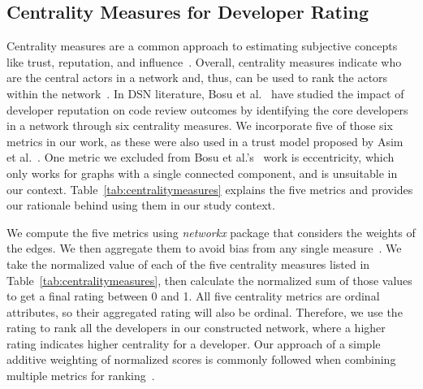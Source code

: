 \documentclass[10pt,journal,compsoc]{IEEEtran}
\begin{document}
\subsection{Centrality Measures for Developer Rating}
\label{sec:centrality}
 Centrality measures are a common approach to estimating subjective concepts like trust, reputation, and influence~\cite{bosu2014identifying, asim2019trust, ceolin2017social, meo2017using, zahi2020improved, csimcsek2020combined}. Overall, centrality measures indicate who are the central actors in a network and, thus, can be used to rank the actors within the network~\cite{riquelme2018centrality, cadini2009using}. In DSN literature, Bosu et al.~\cite{bosu2014impact} have studied the impact of developer reputation on code review outcomes by identifying the core developers in a network through six centrality measures. We incorporate five of those six metrics in our work, as these were also used in a trust model proposed by Asim et al.~\cite{asim2019trust}. One metric we excluded from Bosu et al.'s~\cite{bosu2014impact} work is eccentricity, which only works for graphs with a single connected component, and is unsuitable in our context. Table~\ref{tab:centralitymeasures} explains the five metrics and provides our rationale behind using them in our study context. 

We compute the five metrics using \textit{networkx} package that considers the weights of the edges. We then aggregate them to avoid bias from any single measure~\cite{bosu2014identifying, csimcsek2020combined}. We take the normalized value of each of the five centrality measures listed in Table~\ref{tab:centralitymeasures}, then calculate the normalized sum of those values to get a final rating between 0 and 1. All five centrality metrics are ordinal attributes, so their aggregated rating will also be ordinal. Therefore, we use the rating to rank all the developers in our constructed network, where a higher rating indicates higher centrality for a developer. Our approach of a simple additive weighting of normalized scores is commonly followed when combining multiple metrics for ranking~\cite{tofallis2014add, shabrina2022investigating, cody2018investigation}. 

\label{devsurvey}
\end{document}
